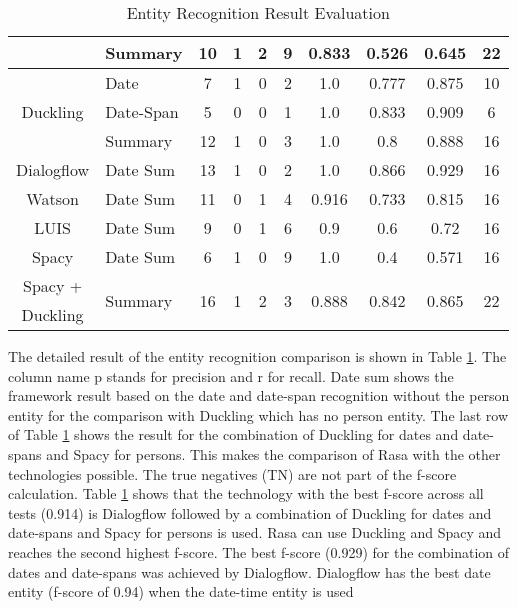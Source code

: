 \begin{table}[h]
\begin{tabular}{ c | l | c | c | c | c | c | c | c | c }
        & Summary & 10 & 1 & 2 & 9 & 0.833 & 0.526 & 0.645 & 22 \\ \hline
        \multirow{3}{*}{Duckling} 
        & Date & 7 & 1 & 0 & 2 & 1.0 & 0.777 & 0.875 & 10 \\ 
        & Date-Span & 5 & 0 & 0 & 1 & 1.0 & 0.833 & 0.909 & 6 \\ \cline{2-10}
        & Summary & 12 & 1 & 0 & 3 & 1.0 & 0.8 & 0.888 & 16 \\ \hline
        Dialogflow & Date Sum & 13 & 1 & 0 & 2 & 1.0 & 0.866 & 0.929 & 16 \\ \hline
        Watson & Date Sum & 11 & 0 & 1 & 4 & 0.916 & 0.733 & 0.815 & 16 \\ \hline
        LUIS & Date Sum & 9 & 0 & 1 & 6 & 0.9 & 0.6 & 0.72 & 16 \\ \hline
        Spacy & Date Sum & 6 & 1 & 0 & 9 & 1.0 & 0.4 & 0.571 & 16 \\ \hline
        Spacy + & \multirow{2}{*}{Summary} & \multirow{2}{*}{16} & \multirow{2}{*}{1} & \multirow{2}{*}{2} & \multirow{2}{*}{3} & \multirow{2}{*}{0.888} & \multirow{2}{*}{0.842} & \multirow{2}{*}{0.865} & \multirow{2}{*}{22} \\
        Duckling & & & & & & & & & \\
    \end{tabular}
    \caption{Entity Recognition Result Evaluation} \label{tab:entity_extraction_eval}
\end{table} \noindent
The detailed result of the entity recognition comparison is shown in Table \ref{tab:entity_extraction_eval}.
The column name p stands for precision and r for recall.
Date sum shows the framework result based on the date and date-span recognition
without the person entity for the comparison with Duckling which has no person entity.
The last row of Table \ref{tab:entity_extraction_eval} shows the result for the combination 
of Duckling for dates and date-spans and Spacy for persons.
This makes the comparison of Rasa with the other technologies possible.
The true negatives (TN) are not part of the f-score calculation.
Table \ref{tab:entity_extraction_eval} shows that the technology with the 
best f-score across all tests (0.914) is Dialogflow followed by 
a combination of Duckling for dates and date-spans and Spacy  
for persons is used.
Rasa can use Duckling and Spacy and reaches the second highest f-score.
The best f-score (0.929) for the combination of dates and date-spans was achieved  
by Dialogflow.
Dialogflow has the best date entity (f-score of 0.94) when the date-time entity is used 
